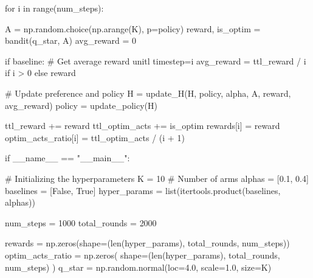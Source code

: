 \documentclass[
  letterpaper,
]{krantz}
\makeatletter
\newenvironment{Shaded}{\begin{snugshade}}{\end{snugshade}}
\newcommand{\BuiltInTok}[1]{\textcolor[rgb]{0.00,0.23,0.31}{#1}}
\newcommand{\CommentTok}[1]{\textcolor[rgb]{0.37,0.37,0.37}{#1}}
\newcommand{\ControlFlowTok}[1]{\textcolor[rgb]{0.00,0.23,0.31}{#1}}
\newcommand{\DecValTok}[1]{\textcolor[rgb]{0.68,0.00,0.00}{#1}}
\newcommand{\FloatTok}[1]{\textcolor[rgb]{0.68,0.00,0.00}{#1}}
\newcommand{\KeywordTok}[1]{\textcolor[rgb]{0.00,0.23,0.31}{#1}}
\newcommand{\NormalTok}[1]{\textcolor[rgb]{0.00,0.23,0.31}{#1}}
\newcommand{\OperatorTok}[1]{\textcolor[rgb]{0.37,0.37,0.37}{#1}}
\newcommand{\StringTok}[1]{\textcolor[rgb]{0.13,0.47,0.30}{#1}}
\newcommand{\VariableTok}[1]{\textcolor[rgb]{0.07,0.07,0.07}{#1}}
\newenvironment{kframe}{%
\medskip{}
\setlength{\fboxsep}{.8em}
 \def\at@end@of@kframe{}%
 \ifinner\ifhmode%
  \def\at@end@of@kframe{\end{minipage}}%
  \begin{minipage}{\columnwidth}%
 \fi\fi%
 \def\FrameCommand##1{\hskip\@totalleftmargin \hskip-\fboxsep
 \colorbox{shadecolor}{##1}\hskip-\fboxsep
     \hskip-\linewidth \hskip-\@totalleftmargin \hskip\columnwidth}%
 \MakeFramed {\advance\hsize-\width
   \@totalleftmargin\z@ \linewidth\hsize
   \@setminipage}}%
 {\par\unskip\endMakeFramed%
 \at@end@of@kframe}
\renewenvironment{Shaded}{\begin{kframe}}{\end{kframe}}
\theoremstyle{plain}
\theoremstyle{definition}
\theoremstyle{definition}
\theoremstyle{remark}
\makeatother
\begin{document}
\begin{codelisting}
\begin{Shaded}
\begin{Highlighting}[]
    \ControlFlowTok{for}\NormalTok{ i }\KeywordTok{in} \BuiltInTok{range}\NormalTok{(num\_steps):}
        
\NormalTok{        A }\OperatorTok{=}\NormalTok{ np.random.choice(np.arange(K), p}\OperatorTok{=}\NormalTok{policy)}
\NormalTok{        reward, is\_optim }\OperatorTok{=}\NormalTok{ bandit(q\_star, A)}
\NormalTok{        avg\_reward }\OperatorTok{=} \DecValTok{0}
        
        \ControlFlowTok{if}\NormalTok{ baseline:}
            \CommentTok{\# Get average reward unitl timestep=i}
\NormalTok{            avg\_reward }\OperatorTok{=}\NormalTok{ ttl\_reward }\OperatorTok{/}\NormalTok{ i }\ControlFlowTok{if}\NormalTok{ i }\OperatorTok{\textgreater{}} \DecValTok{0} \ControlFlowTok{else}\NormalTok{ reward}
        
        \CommentTok{\# Update preference and policy}
\NormalTok{        H }\OperatorTok{=}\NormalTok{ update\_H(H, policy, alpha, A, reward, avg\_reward)}
\NormalTok{        policy }\OperatorTok{=}\NormalTok{ update\_policy(H)}
        
\NormalTok{        ttl\_reward }\OperatorTok{+=}\NormalTok{ reward}
\NormalTok{        ttl\_optim\_acts }\OperatorTok{+=}\NormalTok{ is\_optim}
\NormalTok{        rewards[i] }\OperatorTok{=}\NormalTok{ reward}
\NormalTok{        optim\_acts\_ratio[i] }\OperatorTok{=}\NormalTok{ ttl\_optim\_acts }\OperatorTok{/}\NormalTok{ (i }\OperatorTok{+} \DecValTok{1}\NormalTok{)}


\ControlFlowTok{if} \VariableTok{\_\_name\_\_} \OperatorTok{==} \StringTok{"\_\_main\_\_"}\NormalTok{:}
    
    \CommentTok{\# Initializing the hyperparameters}
\NormalTok{    K }\OperatorTok{=} \DecValTok{10}  \CommentTok{\# Number of arms}
\NormalTok{    alphas }\OperatorTok{=}\NormalTok{ [}\FloatTok{0.1}\NormalTok{, }\FloatTok{0.4}\NormalTok{]}
\NormalTok{    baselines }\OperatorTok{=}\NormalTok{ [}\VariableTok{False}\NormalTok{, }\VariableTok{True}\NormalTok{]}
\NormalTok{    hyper\_params }\OperatorTok{=} \BuiltInTok{list}\NormalTok{(itertools.product(baselines, alphas))}
    
\NormalTok{    num\_steps }\OperatorTok{=} \DecValTok{1000}
\NormalTok{    total\_rounds }\OperatorTok{=} \DecValTok{2000}
    
\NormalTok{    rewards }\OperatorTok{=}\NormalTok{ np.zeros(shape}\OperatorTok{=}\NormalTok{(}\BuiltInTok{len}\NormalTok{(hyper\_params), total\_rounds, num\_steps))}
\NormalTok{    optim\_acts\_ratio }\OperatorTok{=}\NormalTok{ np.zeros(}
\NormalTok{        shape}\OperatorTok{=}\NormalTok{(}\BuiltInTok{len}\NormalTok{(hyper\_params), total\_rounds, num\_steps)}
\NormalTok{        )}
\NormalTok{    q\_star }\OperatorTok{=}\NormalTok{ np.random.normal(loc}\OperatorTok{=}\FloatTok{4.0}\NormalTok{, scale}\OperatorTok{=}\FloatTok{1.0}\NormalTok{, size}\OperatorTok{=}\NormalTok{K)}
    

\end{Highlighting}
\end{Shaded}
\end{codelisting}
\end{document}
